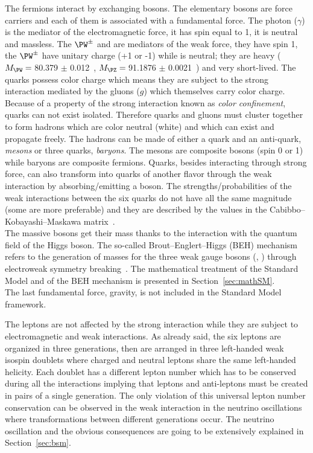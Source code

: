 The fermions interact by exchanging bosons. The elementary bosons are force carriers and each of them is associated with a fundamental force. The photon ($\gamma$) is the mediator of the electromagnetic force, it has spin equal to 1, it is neutral and massless. The $\PW^{\pm}$ and \PZ are mediators of the weak force, they have spin 1, the $\PW^{\pm}$ have unitary charge (+1 or -1) while \PZ is neutral; they are heavy ($M_\PW =\:$80.379 $\pm$ 0.012\GeV~\cite{pdgw}, $M_\PZ =\:$91.1876 $\pm$ 0.0021\GeV~\cite{pdgz}) and very short-lived. The quarks possess color charge which means they are subject to the strong interaction mediated by the gluons ($g$) which themselves carry color charge. Because of a property of the strong interaction known as \emph{color confinement}, quarks can not exist isolated. Therefore quarks and gluons must cluster together to form hadrons which are color neutral (white) and which can exist and propagate freely. The hadrons can be made of either a quark and an anti-quark, \emph{mesons} or three quarks, \emph{baryons}. The mesons are composite bosons (spin 0 or 1) while baryons are composite fermions. Quarks, besides interacting through strong force, can also transform into quarks of another flavor through the weak interaction by absorbing/emitting a \PW boson. The strengths/probabilities of the weak interactions between the six quarks do not have all the same magnitude (some are more preferable) and they are described by the values in the Cabibbo–Kobayashi–Maskawa matrix~\cite{10.1143/PTP.28.870}.\\
The massive bosons get their mass thanks to the interaction with the quantum field of the Higgs boson. The so-called Brout–Englert–Higgs (BEH) mechanism refers to the generation of masses for the three weak gauge bosons (\PW, \PZ) through electroweak symmetry breaking~\cite{PhysRevLett.13.321,PhysRevLett.13.508}. The mathematical treatment of the Standard Model and of the BEH mechanism is presented in Section~\ref{sec:mathSM}.\\
The last fundamental force, gravity, is not included in the Standard Model framework. 

The leptons are not affected by the strong interaction while they are subject to electromagnetic and weak interactions. As already said, the six leptons are organized in three generations, then are arranged in three left-handed weak isospin doublets where charged and neutral leptons share the same left-handed helicity. Each doublet has a different lepton number which has to be conserved during all the interactions implying that leptons and anti-leptons must be created in pairs of a single generation. The only violation of this universal lepton number conservation can be observed in the weak interaction in the neutrino oscillations where transformations between different generations occur. The neutrino oscillation and the obvious consequences are going to be extensively explained in Section~\ref{sec:bsm}. 


